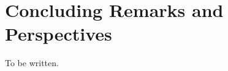 \section{Concluding Remarks and Perspectives}\label{sec:conclusions}

{\color{red} To be written.}

